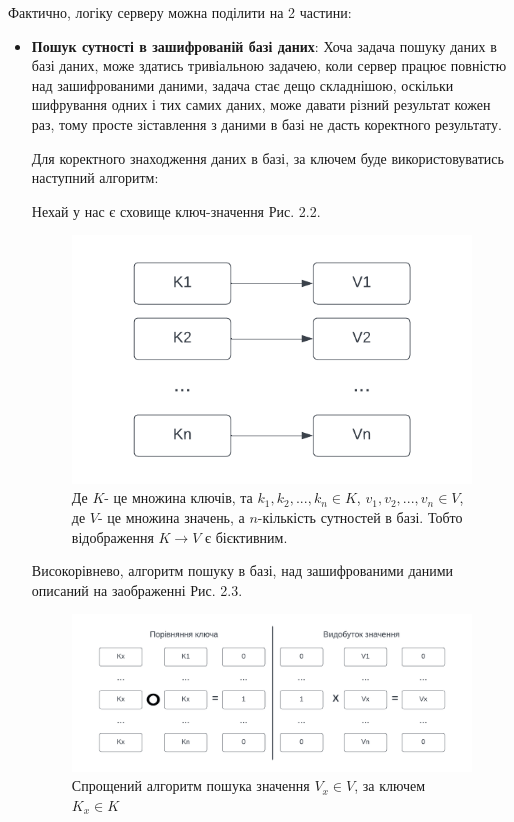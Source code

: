 Фактично, логіку серверу можна поділити на 2 частини:
\begin{itemize}
    \item{\textbf{Пошук сутності в зашифрованій базі даних}: Хоча задача пошуку даних в базі
даних, може здатись тривіальною задачею, коли сервер працює повністю над зашифрованими даними,
задача стає дещо складнішою, оскільки шифрування одних і тих самих даних, може давати різний
результат кожен раз, тому просте зіставлення з даними в базі не дасть коректного результату.

Для коректного знаходження даних в базі, за ключем буде використовуватись наступний алгоритм:

Нехай у нас є сховище ключ-значення Рис. 2.2.


\begin{figure}[!ht]
    \centering
    \label{fig:key-value-storage}
    \includegraphics[scale=1.25]{static/key-value-storage.png}
    \caption{Де \(K\)- це множина ключів, та \(k_1,k_2,...,k_n \in K\), \(v_1, v_2,...,v_n 
    \in V\), де \(V\)- це множина значень, а \(n\)-кількість сутностей в базі. Тобто
    відображення \(K \rightarrow V\) є бієктивним.}
\end{figure}

    Високорівнево, алгоритм пошуку в базі, над зашифрованими даними описаний на заображенні
    Рис. 2.3.

\begin{figure}[!ht]
    \label{fig:basic-value-extraction}
    \includegraphics[scale=0.85]{static/basic-value-extraction.png} 
    \caption{Спрощений алгоритм пошука значення \(V_x \in V\), за ключем \(K_x \in K\)}
\end{figure}

}
\end{itemize}
